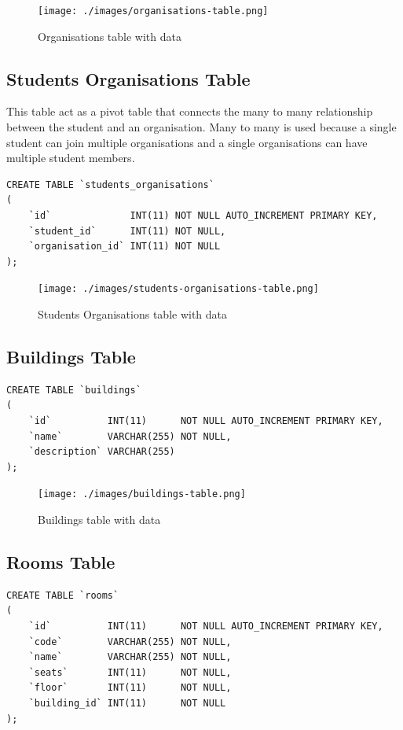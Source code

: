 \documentclass[12pt,titlepage]{article}
\begin{document}
\begin{figure}[h]
    \centering
    \texttt{[image: ./images/organisations-table.png]}
    \caption{Organisations table with data}
\end{figure}

\subsection{Students Organisations Table}
This table act as a pivot table that connects the many to many relationship between the student and an organisation.
Many to many is used because a single student can join multiple organisations and a single organisations can have multiple student members.

\begin{verbatim}
CREATE TABLE `students_organisations`
(
    `id`              INT(11) NOT NULL AUTO_INCREMENT PRIMARY KEY,
    `student_id`      INT(11) NOT NULL,
    `organisation_id` INT(11) NOT NULL
);
\end{verbatim}

\begin{figure}[h]
    \centering
    \texttt{[image: ./images/students-organisations-table.png]}
    \caption{Students Organisations table with data}
\end{figure}

\subsection{Buildings Table}
\begin{verbatim}
CREATE TABLE `buildings`
(
    `id`          INT(11)      NOT NULL AUTO_INCREMENT PRIMARY KEY,
    `name`        VARCHAR(255) NOT NULL,
    `description` VARCHAR(255)
);
\end{verbatim}

\begin{figure}[h]
    \centering
    \texttt{[image: ./images/buildings-table.png]}
    \caption{Buildings table with data}
\end{figure}

\pagebreak

\subsection{Rooms Table}
\begin{verbatim}
CREATE TABLE `rooms`
(
    `id`          INT(11)      NOT NULL AUTO_INCREMENT PRIMARY KEY,
    `code`        VARCHAR(255) NOT NULL,
    `name`        VARCHAR(255) NOT NULL,
    `seats`       INT(11)      NOT NULL,
    `floor`       INT(11)      NOT NULL,
    `building_id` INT(11)      NOT NULL
);
\end{verbatim}
\end{document}
